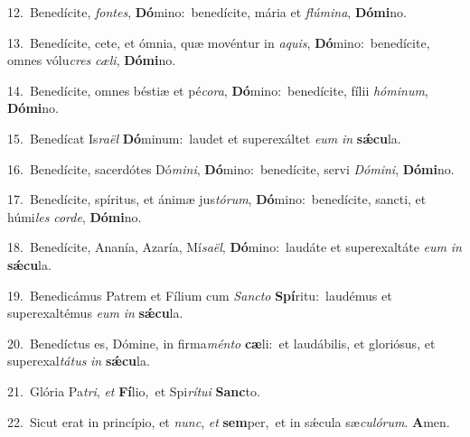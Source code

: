 {\numbfont\textcolor{\numbcolor}{12.}}~Benedícite, \textit{fon}\-\textit{tes}, \textbf{Dó}\-mino:~\star benedícite, mária et \textit{flú}\-\textit{mi}\textit{na}, \textbf{Dó}\-\textbf{mi}no.\par
{\numbfont\textcolor{\numbcolor}{13.}}~Benedícite, cete, et ómnia, quæ movéntur in \textit{a}\-\textit{quis}, \textbf{Dó}\-mino:~\star benedícite, omnes vólu\textit{cres} \textit{cæ}\-\textit{li}, \textbf{Dó}\-\textbf{mi}no.\par
{\numbfont\textcolor{\numbcolor}{14.}}~Benedícite, omnes béstiæ et pé\-\textit{co}\-\textit{ra}, \textbf{Dó}\-mino:~\star benedícite, fílii \textit{hó}\-\textit{mi}\textit{num}, \textbf{Dó}\-\textbf{mi}no.\par
{\numbfont\textcolor{\numbcolor}{15.}}~Benedícat Is\-\textit{ra}\-\textit{ël} \textbf{Dó}\-minum:~\star laudet et superexáltet \textit{e}\-\textit{um} \textit{in} \textbf{sǽ}\-\textbf{cu}la.\par
{\numbfont\textcolor{\numbcolor}{16.}}~Benedícite, sacerdótes Dó\-\textit{mi}\-\textit{ni}, \textbf{Dó}\-mino:~\star benedícite, servi \textit{Dó}\-\textit{mi}\textit{ni}, \textbf{Dó}\-\textbf{mi}no.\par
{\numbfont\textcolor{\numbcolor}{17.}}~Benedícite, spíritus, et ánimæ jus\-\textit{tó}\-\textit{rum}, \textbf{Dó}\-mino:~\star benedícite, sancti, et húmi\textit{les} \textit{cor}\-\textit{de}, \textbf{Dó}\-\textbf{mi}no.\par
{\numbfont\textcolor{\numbcolor}{18.}}~Benedícite, Ananía, Azaría, Mí\-\textit{sa}\-\textit{ël}, \textbf{Dó}\-mino:~\star laudáte et superexaltáte \textit{e}\-\textit{um} \textit{in} \textbf{sǽ}\-\textbf{cu}la.\par
{\numbfont\textcolor{\numbcolor}{19.}}~Benedicámus Patrem et Fílium cum \textit{Sanc}\-\textit{to} \textbf{Spí}\-ritu:~\star laudémus et superexaltémus \textit{e}\-\textit{um} \textit{in} \textbf{sǽ}\-\textbf{cu}la.\par
{\numbfont\textcolor{\numbcolor}{20.}}~Benedíctus es, Dómine, in firma\-\textit{mén}\-\textit{to} \textbf{cæ}\-li:~\star et laudábilis, et gloriósus, et superexal\-\textit{tá}\-\textit{tus} \textit{in} \textbf{sǽ}\-\textbf{cu}la.\par
{\numbfont\textcolor{\numbcolor}{21.}}~Glória Pa\-\textit{tri}\-, \textit{et} \textbf{Fí}\-lio,~\star et Spi\-\textit{rí}\-\textit{tu}\textit{i} \textbf{Sanc}\-to.\par
{\numbfont\textcolor{\numbcolor}{22.}}~Sicut erat in princípio, et \textit{nunc}\-, \textit{et} \textbf{sem}\-per,~\star et in sǽcula sæ\-\textit{cu}\-\textit{ló}\textit{rum}. \textbf{A}\-men.\par
